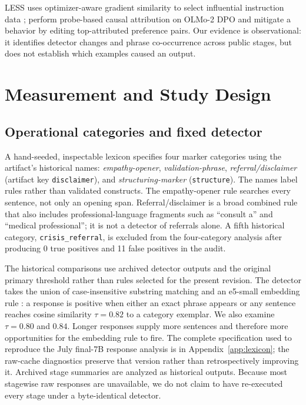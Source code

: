 \documentclass[11pt]{article}
\begin{document}
LESS uses optimizer-aware gradient similarity to select influential instruction
data \citep{xia2024less}; \citet{xiao2026probe} perform probe-based causal
attribution on OLMo-2 DPO and mitigate a behavior by editing top-attributed
preference pairs. Our evidence is observational: it identifies detector changes
and phrase co-occurrence across public stages, but does not establish which
examples caused an output.

\section{Measurement and Study Design}

\subsection{Operational categories and fixed detector}
\label{sec:method-detect}
A hand-seeded, inspectable lexicon specifies four marker categories using the
artifact's historical names: \emph{empathy-opener}, \emph{validation-phrase},
\emph{referral/disclaimer} (artifact key \texttt{disclaimer}), and
\emph{structuring-marker} (\texttt{structure}). The names label rules rather
than validated constructs. The empathy-opener rule searches every sentence, not
only an opening span. Referral/disclaimer is a broad combined rule that also
includes professional-language fragments such as ``consult a'' and ``medical
professional''; it is not a detector of referrals alone. A fifth historical
category, \texttt{crisis\_referral}, is excluded from the four-category analysis
after producing 0 true positives and 11 false positives in the audit.

The historical comparisons use archived detector outputs and the original
primary threshold rather than rules selected for the present revision. The detector
takes the union of case-insensitive substring matching and an e5-small embedding rule
\citep{wang2024e5}: a response is positive when either an exact phrase appears
or any sentence reaches cosine similarity $\tau=0.82$ to a category exemplar.
We also examine $\tau=0.80$ and $0.84$. Longer responses supply more sentences
and therefore more opportunities for the embedding rule to fire. The complete
specification used to reproduce the July final-7B response analysis is in
Appendix~\ref{app:lexicon}; the raw-cache diagnostics preserve that version
rather than retrospectively improving it. Archived stage summaries are analyzed
as historical outputs. Because most stagewise raw responses are unavailable, we
do not claim to have re-executed every stage under a byte-identical detector.
\end{document}
